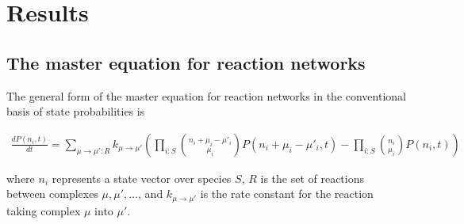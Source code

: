 \section{\label{sec:results}Results}


\subsection{The master equation for reaction networks}
The general form of the master equation for reaction networks in the conventional basis of state probabilities is
\begin{widetext}
\begin{align*}
\frac{d P(n_i,t)}{dt} = \sum_{\mu \rightarrow \mu' \colon R} k_{\mu \rightarrow \mu'} \left(\prod_{i \colon S} \binom{n_i + \mu_i - \mu'_i}{\mu_i} P(n_i + \mu_i - \mu'_i,t) - \prod_{i \colon S} \binom{n_i}{\mu_i} P(n_i,t) \right)
\end{align*}
\end{widetext}
where $n_i$ represents a state vector over species $S$, $R$ is the set of reactions between complexes $\mu, \mu', \ldots$, and $k_{\mu \rightarrow \mu'}$ is the rate constant for the reaction taking complex $\mu$ into $\mu'$.


